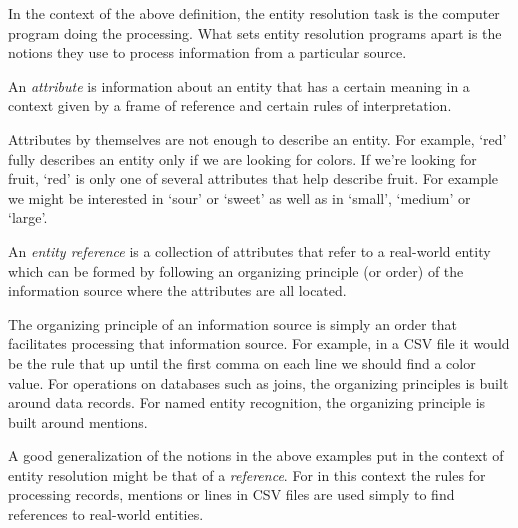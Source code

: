 \documentclass[11pt]{article}
\begin{document}
    In the context of the above definition, the entity resolution task is the
    computer program doing the processing.
    What sets entity resolution programs apart is the notions they use to
    process information from a particular source.

    \begin{defn}
        An \textit{attribute} is information about an entity that has a certain
        meaning in a context given by a frame of reference and certain rules of
        interpretation.
    \end{defn}

    Attributes by themselves are not enough to describe an entity.
    For example, `red' fully describes an entity only if we are looking for
    colors.
    If we're looking for fruit, `red' is only one of several attributes that
    help describe fruit.
    For example we might be interested in `sour' or `sweet' as well as in
    `small', `medium' or `large'.

    \begin{defn}
        An \textit{entity reference} is a collection of attributes that refer
        to a real-world entity which can be formed by following an organizing
        principle (or order) of the information source where the attributes are
        all located.
    \end{defn}

    The organizing principle of an information source is simply an order that
    facilitates processing that information source.
    For example, in a CSV file it would be the rule that up until the first
    comma on each line we should find a color value.
    For operations on databases such as joins, the organizing principles is
    built around data records.
    For named entity recognition, the organizing principle is built around
    mentions.

    A good generalization of the notions in the above examples put in the
    context of entity resolution might be that of a
    \textit{reference}\cite{Ben2009Swoosh}.
    For in this context the rules for processing records, mentions or lines in
    CSV files are used simply to find references to real-world entities.
\end{document}
